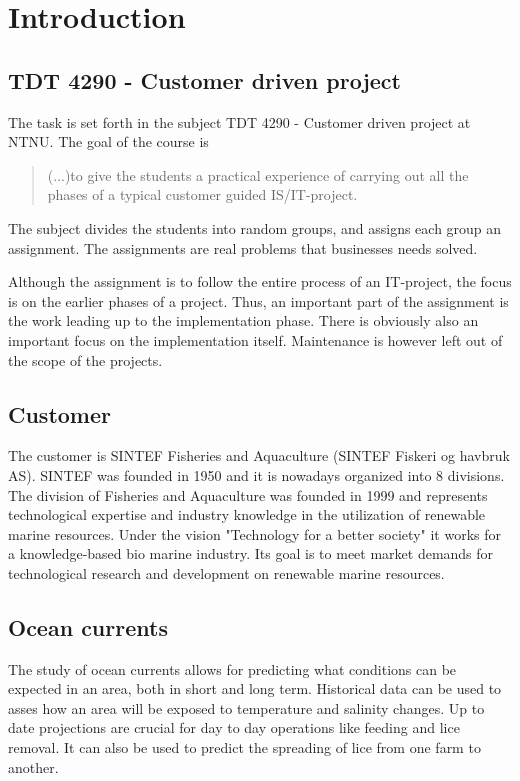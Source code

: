 \documentclass[11pt,a4paper,titlepage,oneside]{report}
\begin{document}
\chapter{Introduction}
\section{TDT 4290 - Customer driven project}
The task is set forth in the subject TDT 4290 - Customer driven project at \gls{NTNU}. The goal of the course is 
\begin{quote}
(...)to give the students a practical experience of carrying out all the phases of a typical customer guided IS/IT-project. \cite{TDT4290:Intro}
\end{quote}
The subject divides the students into random groups, and assigns each group an assignment. The assignments are real problems that businesses needs solved. 

Although the assignment is to follow the entire process of an IT-project, the focus is on the earlier phases of a project. Thus, an important part of the assignment is the work leading up to the implementation phase. There is obviously also an important focus on the implementation itself. Maintenance is however left out of the scope of the projects.

\section{Customer}
The customer is SINTEF Fisheries and Aquaculture (SINTEF Fiskeri og havbruk AS). 
SINTEF was founded in 1950 and it is nowadays organized into 8 divisions. The division of Fisheries and Aquaculture was founded in 1999 and represents technological expertise and industry knowledge in the utilization of renewable marine resources. Under the vision "Technology for a better society" it works for a knowledge-based bio marine industry. Its goal is to meet market demands for technological research and development on renewable marine resources.

\section{Ocean currents}
The study of ocean currents allows for predicting what conditions can be expected in an area, both in short and long term. Historical data can be used to asses how an area will be exposed to temperature and salinity changes. Up to date projections are crucial for day to day operations like feeding and lice removal. It can also be used to predict the spreading of lice from one farm to another.
\end{document}
